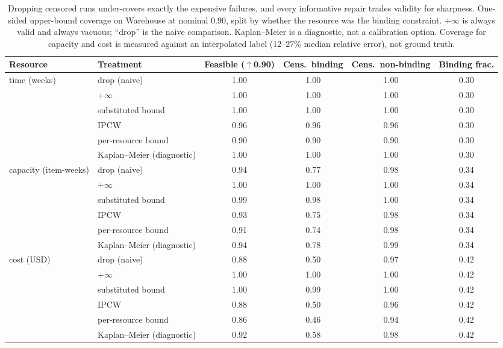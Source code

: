 \documentclass{article}
\begin{document}
\begin{table}[t]
\centering
\caption{Dropping censored runs under-covers exactly the expensive failures, and every informative repair trades validity for sharpness. One-sided upper-bound coverage on Warehouse at nominal 0.90, split by whether the resource was the binding constraint. $+\infty$ is always valid and always vacuous; ``drop'' is the naive comparison. Kaplan--Meier is a diagnostic, not a calibration option. Coverage for capacity and cost is measured against an interpolated label (12--27\% median relative error), not ground truth.}
\label{tab:censored}
\small
\begin{tabular}{@{}llcccc@{}}
\toprule
Resource & Treatment & Feasible ($\uparrow$0.90) & Cens.\ binding & Cens.\ non-binding & Binding frac. \\
\midrule
\multirow{6}{*}{time (weeks)}
 & drop (naive) & 1.00 & 1.00 & 1.00 & 0.30 \\
 & $+\infty$ & 1.00 & 1.00 & 1.00 & 0.30 \\
 & substituted bound & 1.00 & 1.00 & 1.00 & 0.30 \\
 & IPCW & 0.96 & 0.96 & 0.96 & 0.30 \\
 & per-resource bound & 0.90 & 0.90 & 0.90 & 0.30 \\
 & Kaplan--Meier (diagnostic) & 1.00 & 1.00 & 1.00 & 0.30 \\
\midrule
\multirow{6}{*}{capacity (item-weeks)}
 & drop (naive) & 0.94 & 0.77 & 0.98 & 0.34 \\
 & $+\infty$ & 1.00 & 1.00 & 1.00 & 0.34 \\
 & substituted bound & 0.99 & 0.98 & 1.00 & 0.34 \\
 & IPCW & 0.93 & 0.75 & 0.98 & 0.34 \\
 & per-resource bound & 0.91 & 0.74 & 0.98 & 0.34 \\
 & Kaplan--Meier (diagnostic) & 0.94 & 0.78 & 0.99 & 0.34 \\
\midrule
\multirow{6}{*}{cost (USD)}
 & drop (naive) & 0.88 & 0.50 & 0.97 & 0.42 \\
 & $+\infty$ & 1.00 & 1.00 & 1.00 & 0.42 \\
 & substituted bound & 1.00 & 0.99 & 1.00 & 0.42 \\
 & IPCW & 0.88 & 0.50 & 0.96 & 0.42 \\
 & per-resource bound & 0.86 & 0.46 & 0.94 & 0.42 \\
 & Kaplan--Meier (diagnostic) & 0.92 & 0.58 & 0.98 & 0.42 \\
\bottomrule
\end{tabular}
\end{table}
\end{document}

